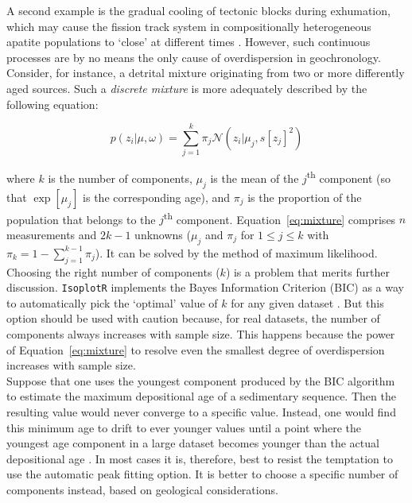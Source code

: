 \documentclass{article}
\begin{document}
A second example is the gradual cooling of tectonic blocks during
exhumation, which may cause the fission track system in
compositionally heterogeneous apatite populations to `close' at
different times \citep{green1986}. However, such continuous processes
are by no means the only cause of overdispersion in geochronology.\\

Consider, for instance, a detrital mixture originating from two or
more differently aged sources. Such a \emph{discrete mixture} is more
adequately described by the following equation:

\begin{equation}
  p(z_i|\mu,\omega) = \sum_{j=1}^k \pi_j \mathcal{N}\left( z_i |
  \mu_j, s[z_j]^2 \right)
  \label{eq:mixture}
\end{equation}

\noindent where $k$ is the number of components, $\mu_j$ is the mean
of the $j$\textsuperscript{th} component (so that $\exp[\mu_j]$ is the
corresponding age), and $\pi_j$ is the proportion of the population
that belongs to the $j$\textsuperscript{th}
component. Equation~\ref{eq:mixture} comprises $n$ measurements and
$2k-1$ unknowns ($\mu_j$ and $\pi_j$ for $1 \leq j \leq k$ with
$\pi_k=1-\sum_{j=1}^{k-1}\pi_j$). It can be solved by the method of
maximum likelihood.\\

Choosing the right number of components ($k$) is a problem that merits
further discussion. \texttt{IsoplotR} implements the Bayes Information
Criterion (BIC) as a way to automatically pick the `optimal' value of
$k$ for any given dataset \citep[Section~5.6 of][]{galbraith2005}. But
this option should be used with caution because, for real datasets,
the number of components always increases with sample size. This
happens because the power of Equation~\ref{eq:mixture} to resolve even
the smallest degree of overdispersion increases with sample
size.\\

Suppose that one uses the youngest component produced by the BIC
algorithm to estimate the maximum depositional age of a sedimentary
sequence. Then the resulting value would never converge to a specific
value.  Instead, one would find this minimum age to drift to ever
younger values until a point where the youngest age component in a
large dataset becomes younger than the actual depositional age
\citep[Figure~3 of][]{vermeesch2018}. In most cases it is, therefore,
best to resist the temptation to use the automatic peak fitting
option. It is better to choose a specific number of components
instead, based on geological considerations.\\
\end{document}
